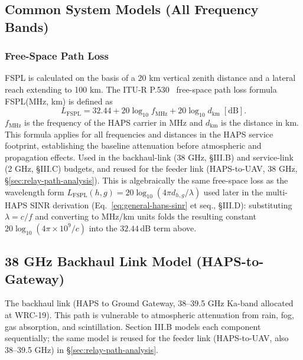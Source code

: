 \documentclass[conference]{IEEEtran}
\begin{document}
\subsection{Common System Models (All Frequency Bands)}

\subsubsection{Free-Space Path Loss~\cite{itu_p530}}
FSPL is calculated on the basis of a 20 km vertical zenith distance and a lateral reach extending to 100 km.
The ITU-R P.530~\cite{itu_p530} free-space path loss formula FSPL(MHz, km) is defined as
\begin{equation}
L_\mathrm{FSPL} = 32.44 + 20\log_{10} f_\mathrm{MHz} + 20\log_{10} d_\mathrm{km} \;[\mathrm{dB}].
\label{eq:fspl}
\end{equation}
$f_\mathrm{MHz}$ is the frequency of the HAPS carrier in MHz and $d_\mathrm{km}$ is the distance in km. This formula applies for all frequencies and distances in the HAPS service footprint, establishing the baseline attenuation before atmospheric and propagation effects. Used in the backhaul-link (38 GHz, §III.B) and service-link (2 GHz, §III.C) budgets, and reused for the feeder link (HAPS-to-UAV, 38 GHz, §\ref{sec:relay-path-analysis}). This is algebraically the same free-space loss as the wavelength form $L_\mathrm{FSPL}(h,g)=20\log_{10}(4\pi d_{h,g}/\lambda)$ used later in the multi-HAPS SINR derivation (Eq.~\eqref{eq:general-haps-sinr} et seq., \S III.D): substituting $\lambda=c/f$ and converting to MHz/km units folds the resulting constant $20\log_{10}(4\pi\times10^9/c)$ into the $32.44$\,dB term above.

\subsection{38 GHz Backhaul Link Model (HAPS-to-Gateway)}

The backhaul link (HAPS to Ground Gateway, 38--39.5 GHz Ka-band allocated at WRC-19). This path is vulnerable to atmospheric attenuation from rain, fog, gas absorption, and scintillation. Section III.B models each component sequentially; the same model is reused for the feeder link (HAPS-to-UAV, also 38--39.5 GHz) in \S\ref{sec:relay-path-analysis}.
\end{document}
